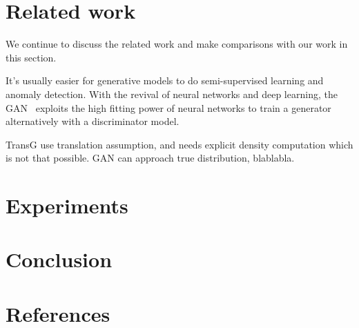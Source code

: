 \documentclass[twocolumn,a4paper,10pt,review,5p]{elsarticle}
\begin{document}

\section{Related work}

We continue to discuss the related work and make comparisons with our work in this section.

It's usually easier for generative models to do semi-supervised learning and anomaly detection. With the revival of neural networks and deep learning, the GAN~\cite{GAN} exploits the high fitting power of neural networks to train a generator alternatively with a discriminator model. 

TransG use translation assumption, and needs explicit density computation which is not that possible.
GAN can approach true distribution, blablabla.


\section{Experiments}


\section{Conclusion}

\section*{References}


\end{document}
